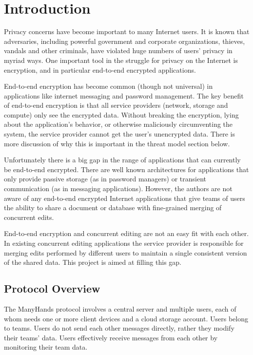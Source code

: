 \documentclass[pldi-cameraready,10pt]{sigplanconf-pldi16}
\begin{document}
\section{Introduction}

Privacy concerns have become important to many Internet users.
It is known that adversaries, including powerful government and corporate organizations, thieves, vandals and other criminals, have violated huge numbers of users' privacy in myriad ways.
One important tool in the struggle for privacy on the Internet is encryption, and in particular end-to-end encrypted applications.

End-to-end encryption has become common (though not universal) in applications like internet messaging and password management.
The key benefit of end-to-end encryption is that all service providers (network, storage and compute) only see the encrypted data.
Without breaking the encryption, lying about the application's behavior, or otherwise maliciously circumventing the system, the service provider cannot get the user's unencrypted data.
There is more discussion of why this is important in the threat model section below.

Unfortunately there is a big gap in the range of applications that can currently be end-to-end encrypted.
There are well known architectures for applications that only provide passive storage (as in password managers) or transient communication (as in messaging applications).
However, the authors are not aware of any end-to-end encrypted Internet applications that give teams of users the ability to share a document or database with fine-grained merging of concurrent edits.

End-to-end encryption and concurrent editing are not an easy fit with each other.
In existing concurrent editing applications the service provider is responsible for merging edits performed by different users to maintain a single consistent version of the shared data.
This project is aimed at filling this gap.

\subsection{Protocol Overview}

The ManyHands protocol involves a central server and multiple users, each of whom needs one or more client devices and a cloud storage account.
Users belong to teams.
Users do not send each other messages directly, rather they modify their teams' data.
Users effectively receive messages from each other by monitoring their team data.
\end{document}
